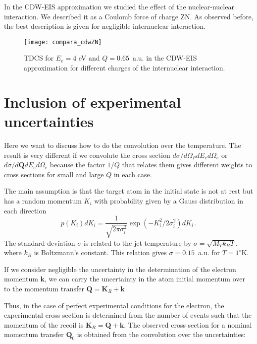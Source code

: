 In the CDW-EIS approximation we studied the effect of the nuclear-nuclear interaction. We described it as a Coulomb force of charge ZN. As observed before, the best description is given for negligible internuclear interaction. 

\begin{figure}[!htpb]
  \centering
\texttt{[image: compara\_cdwZN]}
  \caption{TDCS for $E_{e}=4$ eV and $Q=0.65$~a.u. in the CDW-EIS approximation for different charges of the internuclear interaction.}
  \label{F:compara-cdwZN}
\end{figure}


\section{Inclusion of experimental uncertainties}
\label{S:inclu-exper-uncer}

Here we want to discuss how to do the convolution over the temperature. The result is very different if we convolute the cross section
${d \sigma}/{d \Omega_{P} d E_{e} d \Omega_{e}}$ or $ {d \sigma}/{d \bm{Q} d E_{e} d \Omega_{e}} $ because the factor $1/Q$ that relates them gives different weights to cross sections for small and large $Q$ in each case.

The main assumption is that the target atom in the initial state is not at rest but has a random momentum $K_{i}$ with probability given by a Gauss distribution in each direction
\begin{equation}\label{Q:gauss-distr}
 p(K_{i}) dK_{i} = \frac{1}{\sqrt{2 \pi \sigma_{i}^2}} \exp (-K_{i}^{2} / 2\sigma_{i}^{2}) dK_{i} \, .  
\end{equation}
%
 The standard deviation $\sigma$ is related to the jet temperature by $\sigma=\sqrt{M_{T} k_{B} T}$, where $k_{B}$ is Boltzmann's constant. This relation gives $\sigma = 0.15$~a.u. for $T=1^{\circ}$K.

If we consider negligible the uncertainty in the determination of the electron momentum $\bm{k}$, we can carry the uncertainty in the atom initial momentum over to the momentum transfer $\bm{Q}=\bm{K}_{R}+ \bm{k}$

Thus, in the case of perfect experimental conditions for the electron, the experimental cross section is determined from the number of events such that the  momentum of the recoil is $\bm{K}_{R}=\bm{Q}+\bm{k}$. The observed cross section for a nominal momentum transfer $\bm{Q}_{0}$ is obtained from the convolution over the uncertainties:

